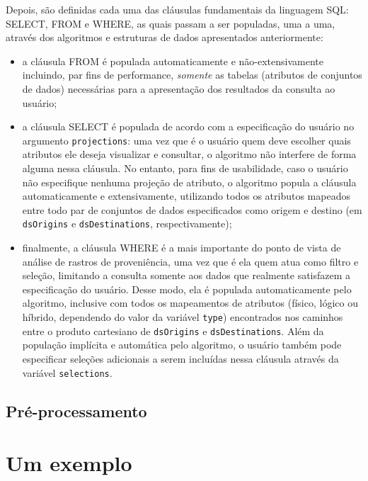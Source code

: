 Depois, são definidas cada uma das cláusulas fundamentais da linguagem SQL: \textsc{SELECT}, \textsc{FROM} e \textsc{WHERE}, as quais passam a ser populadas, uma a uma, através dos algoritmos e estruturas de dados apresentados anteriormente:

\begin{itemize}
    \item a cláusula \textsc{FROM} é populada automaticamente e não-extensivamente incluindo, par fins de performance, \emph{somente} as tabelas (atributos de conjuntos de dados) necessárias para a apresentação dos resultados da consulta ao usuário;
    \item a cláusula \textsc{SELECT} é populada de acordo com a especificação do usuário no argumento \texttt{projections}: uma vez que é o usuário quem deve escolher quais atributos ele deseja visualizar e consultar, o algoritmo não interfere de forma alguma nessa cláusula. No entanto, para fins de usabilidade, caso o usuário não especifique nenhuma projeção de atributo, o algoritmo popula a cláusula automaticamente e extensivamente, utilizando todos os atributos mapeados entre todo par de conjuntos de dados especificados como origem e destino (em \texttt{dsOrigins} e \texttt{dsDestinations}, respectivamente);
    \item finalmente, a cláusula \textsc{WHERE} é a mais importante do ponto de vista de análise de rastros de proveniência, uma vez que é ela quem atua como filtro e seleção, limitando a consulta somente aos dados que realmente satisfazem a especificação do usuário. Desse modo, ela é populada automaticamente pelo algoritmo, inclusive com todos os mapeamentos de atributos (físico, lógico ou híbrido, dependendo do valor da variável \texttt{type}) encontrados nos caminhos entre o produto cartesiano de \texttt{dsOrigins} e \texttt{dsDestinations}. Além da população implícita e automática pelo algoritmo, o usuário também pode especificar seleções adicionais a serem incluídas nessa cláusula através da variável \texttt{selections}.
\end{itemize}

\subsection{Pré-processamento}%
\label{subsec:preprocessamento}


\section{Um exemplo}

